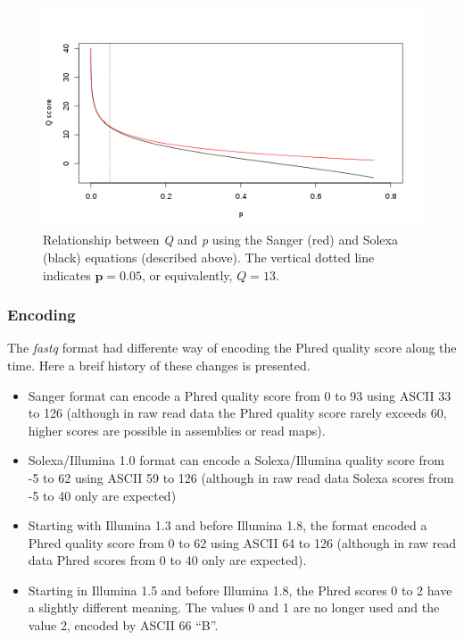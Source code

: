 \documentclass[
  letterpaper,
  DIV=11,
  numbers=noendperiod]{scrreprt}
\providecommand{\tightlist}{%
  \setlength{\itemsep}{0pt}\setlength{\parskip}{0pt}}\usepackage{longtable,booktabs,array}
\begin{document}
\begin{figure}

{\centering \includegraphics{./Probabilitymetrics.png}

}

\caption{\label{fig-Probabilitymetrics}Relationship between \emph{Q} and
\emph{p} using the Sanger (red) and Solexa (black) equations (described
above). The vertical dotted line indicates \(\mathbf{p}= 0.05\), or
equivalently, \(Q = 13\).}

\end{figure}

\hypertarget{encoding}{%
\subsubsection*{Encoding}\label{encoding}}

The \emph{fastq} format had differente way of encoding the Phred quality
score along the time. Here a breif history of these changes is
presented.

\begin{itemize}
\tightlist
\item
  Sanger format can encode a Phred quality score from 0 to 93 using
  ASCII 33 to 126 (although in raw read data the Phred quality score
  rarely exceeds 60, higher scores are possible in assemblies or read
  maps).
\item
  Solexa/Illumina 1.0 format can encode a Solexa/Illumina quality score
  from -5 to 62 using ASCII 59 to 126 (although in raw read data Solexa
  scores from -5 to 40 only are expected)
\item
  Starting with Illumina 1.3 and before Illumina 1.8, the format encoded
  a Phred quality score from 0 to 62 using ASCII 64 to 126 (although in
  raw read data Phred scores from 0 to 40 only are expected).
\item
  Starting in Illumina 1.5 and before Illumina 1.8, the Phred scores 0
  to 2 have a slightly different meaning. The values 0 and 1 are no
  longer used and the value 2, encoded by ASCII 66 ``B''.
\end{itemize}
\end{document}
